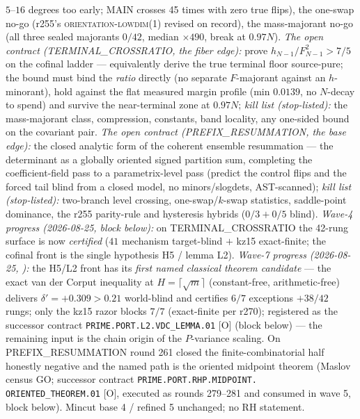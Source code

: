 \documentclass[11pt,a4paper]{article}
\begin{document}
{$5$--$16$ degrees too early; MAIN crosses 45 times with zero true
flips), the one-swap no-go (r255's \textsc{orientation-lowdim(1)}
revised on record), the mass-majorant no-go (all three sealed
majorants $0/42$, median $\times490$, break at $0.97N$).
\emph{The open contract (TERMINAL\_CROSSRATIO, the fiber edge):}
prove $h_{N-1}/F_{N-1}^2 > 7/5$ on the cofinal ladder ---
equivalently derive the true terminal floor source-pure; the
bound must bind the \emph{ratio} directly (no separate
$F$-majorant against an $h$-minorant), hold against the flat
measured margin profile (min $0.0139$, no $N$-decay to spend) and
survive the near-terminal zone at $0.97N$; \emph{kill list
(stop-listed):} the mass-majorant class, compression, constants,
band locality, any one-sided bound on the covariant pair.
\emph{The open contract (PREFIX\_RESUMMATION, the base edge):}
the closed analytic form of the coherent ensemble resummation ---
the determinant as a globally oriented signed partition sum,
completing the coefficient-field pass to a parametrix-level pass
(predict the control flips and the forced tail blind from a
closed model, no minors/slogdets, AST-scanned); \emph{kill list
(stop-listed):} two-branch level crossing, one-swap/$k$-swap
statistics, saddle-point dominance, the r255 parity-rule and
hysteresis hybrids ($0/3 + 0/5$ blind).  \emph{Wave-4 progress
(2026-08-25, block below):} on TERMINAL\_CROSSRATIO the 42-rung
surface is now \emph{certified} ($41$ mechanism target-blind $+$
kz15 exact-finite; the cofinal front is the single hypothesis H5
/ lemma L2).  \emph{Wave-7 progress (2026-08-25,
):} the H5/L2 front has
its \emph{first named classical theorem candidate} --- the exact
van der Corput inequality at $H = \lceil\sqrt{m}\rceil$
(constant-free, arithmetic-free) delivers $\delta' = +0.309 >
0.21$ world-blind and certifies $6/7$ exceptions $+ 38/42$
rungs; only the kz15 razor blocks $7/7$ (exact-finite per r270);
registered as the successor contract
\texttt{PRIME.PORT.L2.\allowbreak VDC\_LEMMA.01} [O] (block
below) --- the remaining input is the chain origin of the
$P$-variance scaling.  On PREFIX\_RESUMMATION round 261 closed the
finite-combinatorial half honestly negative and the named path is
the oriented midpoint theorem (Maslov census GO; successor
contract \texttt{PRIME.PORT.RHP.MIDPOINT.\allowbreak
ORIENTED\_THEOREM.01} [O], executed as rounds 279--281 and
consumed in wave 5, block below).  Mincut base 4 /
refined 5 unchanged; no RH statement.\par}
\end{document}

